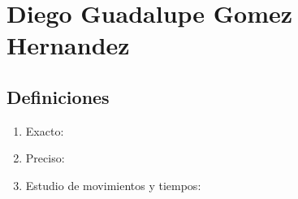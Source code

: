\section{Diego Guadalupe Gomez Hernandez}
\subsection{Definiciones}

\begin{enumerate}
    \item Exacto: 
    \item Preciso:
    \item Estudio de movimientos y tiempos:
\end{enumerate}